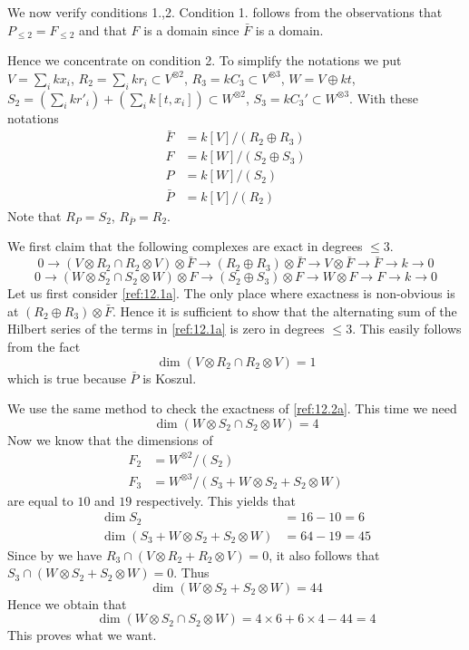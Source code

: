 \documentclass{amsproc}
\def\r{\rightarrow}
\theoremstyle{definition}
\theoremstyle{remark}
\numberwithin{equation}{section}
\numberwithin{table}{section}
\numberwithin{figure}{section}
\begin{document}
We now verify conditions 1.,2.  Condition 1. follows from the
observations that  $P_{\le 2}=F_{\le 2}$
and that $F$ is a domain  since $\bar{F}$ is a domain.

Hence we concentrate on condition 2. To simplify the notations we put
$V=\sum_i kx_i$, $R_2=\sum_i kr_i\subset V^{\otimes 2}$,
$R_3=kC_3\subset  V^{\otimes 3}$, $W=V\oplus kt$,
$S_2=(\sum_i kr'_i)+ (\sum_ik[t,x_i])\subset W^{\otimes 2}$,
$S_3=kC_3'\subset W^{\otimes 3}$.  With these notations
\begin{align*}
\bar{F}&=k[V]/(R_2\oplus R_3)\\
F&=k[W]/(S_2\oplus S_3)\\
P&=k[W]/(S_2)\\
\bar{P}&=k[V]/(R_2)
\end{align*}
Note that $R_P=S_2$,
$R_{\bar{P}}=R_2$. 



 We first claim that the
following complexes are exact in degrees $\le 3$. 
\begin{equation}
\label{ref:12.1a}
0\r (V\otimes R_2\cap R_2\otimes V)\otimes \bar{F}\r
(R_2\oplus R_3)\otimes \bar{F} \r V\otimes \bar{F}\r \bar{F}\r k \r0
\end{equation}
\begin{equation}
\label{ref:12.2a}
0\r (W\otimes S_2\cap S_2\otimes W)\otimes F\r
(S_2\oplus S_3)\otimes {F} \r W\otimes {F}\r {F}\r k \r0
\end{equation}
Let us first consider \eqref{ref:12.1a}. The only place where exactness
is non-obvious is
at $(R_2\oplus R_3)\otimes \bar{F}$. Hence it is sufficient
to show that the alternating sum of the Hilbert series of the terms in
\eqref{ref:12.1a} is zero in
degrees $\le 3$. This easily follows from the fact 
\[
\dim (V\otimes R_2\cap R_2\otimes V)=1
\]
which is true because  $\bar{P}$ is Koszul.

We use the same method to check the exactness of
\eqref{ref:12.2a}. This time we need 
\[
\dim(W\otimes S_2\cap S_2\otimes W)=4
\]
Now we know that the dimensions of 
\begin{align*}
F_2&=W^{\otimes 2}/ (S_2)\\
F_3&=W^{\otimes 3} /(S_3+W\otimes S_2+ S_2\otimes W)
\end{align*}
are equal to $10$ and $19$ respectively. This yields that
\begin{align*}
\dim S_2&=16-10=6\\
\dim (S_3+W\otimes S_2+ S_2\otimes W)&=64-19=45
\end{align*}
Since by \cite{ATV1} we have $R_3\cap (V\otimes R_2+R_2\otimes V)=0$, it
also follows that
$
S_3\cap(W\otimes S_2+S_2\otimes W)=0
$.
Thus 
\[
\dim (W\otimes S_2+S_2\otimes W)=44
\]
Hence we obtain that
\[
\dim(W\otimes S_2\cap S_2\otimes W)=4\times 6+6\times 4-44=4
\]
This proves what we want.
\end{document}
